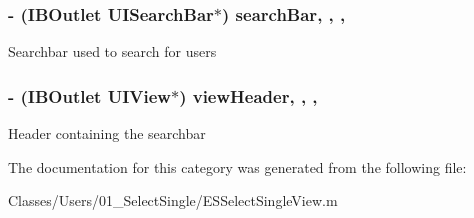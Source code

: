 \subsubsection[{search\+Bar}]{\setlength{\rightskip}{0pt plus 5cm}-\/ (I\+B\+Outlet U\+I\+Search\+Bar$\ast$) search\+Bar\hspace{0.3cm}{\ttfamily [read]}, {\ttfamily [write]}, {\ttfamily [nonatomic]}, {\ttfamily [strong]}}\label{category_e_s_select_single_view_07_08_a1819c9c0923b4b728dcc8b84fc6f5337}
Searchbar used to search for users \hypertarget{category_e_s_select_single_view_07_08_af56705aecef2fbcbf9d7feda0e82b9d7}{}
\subsubsection[{view\+Header}]{\setlength{\rightskip}{0pt plus 5cm}-\/ (I\+B\+Outlet U\+I\+View$\ast$) view\+Header\hspace{0.3cm}{\ttfamily [read]}, {\ttfamily [write]}, {\ttfamily [nonatomic]}, {\ttfamily [strong]}}\label{category_e_s_select_single_view_07_08_af56705aecef2fbcbf9d7feda0e82b9d7}
Header containing the searchbar 

The documentation for this category was generated from the following file\+:\begin{DoxyCompactItemize}
\item 
Classes/\+Users/01\+\_\+\+Select\+Single/E\+S\+Select\+Single\+View.\+m\end{DoxyCompactItemize}

